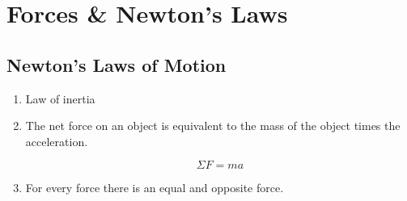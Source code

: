 \chapter{Forces \& Newton's Laws}

\section{Newton's Laws of Motion}

\begin{enumerate}
    \item Law of inertia

    \item The net force on an object is equivalent
    to the mass of the object times the acceleration.

    $$\Sigma F = ma$$

    \item For every force there is an equal and
    opposite force.
\end{enumerate}
